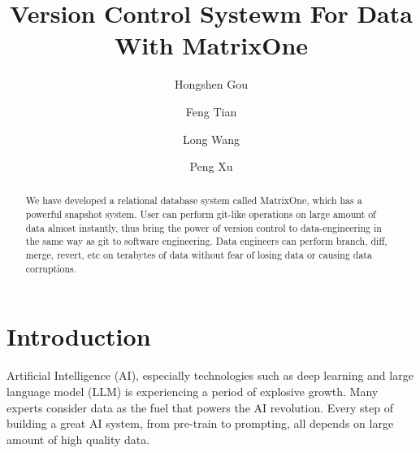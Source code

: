 \documentclass[sigconf,nonacm]{acmart} %
\begin{document}
\title{Version Control Systewm For Data With MatrixOne}

\author{Hongshen Gou}

\author{Feng Tian}

\author{Long Wang}

\author{Peng Xu}

\begin{abstract}
We have developed a relational database system called MatrixOne, which has 
a powerful snapshot system.  User can perform git-like operations on 
large amount of data almost instantly, thus bring the power of version 
control to data-engineering in the same way as git to software engineering.
Data engineers can perform branch, diff, merge, revert, etc on terabytes of data 
without fear of losing data or causing data corruptions.
\end{abstract}

\maketitle

\section{Introduction}
Artificial Intelligence (AI), especially technologies such as deep learning 
and large language model (LLM) is experiencing a period of explosive 
growth.  Many experts consider data as the fuel that powers the AI revolution.
Every step of building a great AI system, from pre-train to prompting, all 
depends on large amount of high quality data.
\end{document}
